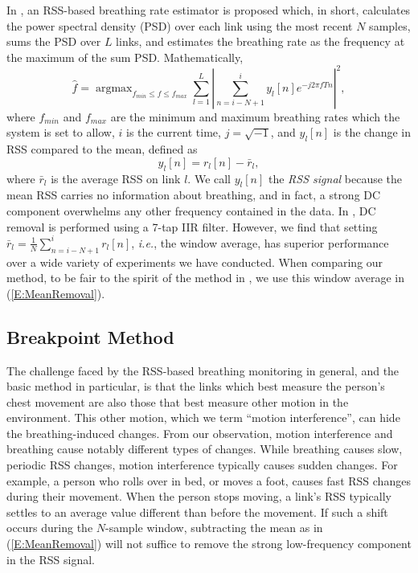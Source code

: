 \documentclass[10pt,journal,letterpaper]{IEEEtran}
\newcommand{\ie}{{\it i.e.}}
\newcommand{\argmax}[1]{\mathop{\mbox{argmax}}_{#1}}
\begin{document}
In \cite{patwari11breathing}, an RSS-based breathing rate estimator is proposed which, in short, calculates the power spectral density (PSD) over each link using the most recent $N$ samples, sums the PSD over $L$ links, and estimates the breathing rate as the frequency at the maximum of the sum PSD.  Mathematically,
\begin{equation} \label{E:PSD}
\hat{f} = \argmax{f_{min} \le f \le f_{max}} \sum_{l=1}^L \left| \sum_{n=i-N+1}^{i} y_l[n] e^{-j 2\pi f T n}\right|^2,
\end{equation}
where $f_{min}$ and $f_{max}$ are the minimum and maximum breathing rates which the system is set to allow, $i$ is the current time, $j=\sqrt{-1}$, and $y_l[n]$ is the change in RSS compared to the mean, defined as
\begin{equation}\label{E:MeanRemoval}
y_l[n] = r_l[n] - \bar{r}_l,
\end{equation}
where $\bar{r}_l$ is the average RSS on link $l$.  We call $y_l[n]$ the \emph{RSS signal} because the mean RSS carries no information about breathing, and in fact, a strong DC component overwhelms any other frequency contained in the data.  In \cite{patwari11breathing}, DC removal is performed using a 7-tap IIR filter.  However, we find that setting $\bar{r}_l = \frac{1}{N} \sum_{n=i-N+1}^{i} r_l[n]$, \ie, the window average, has superior performance over a wide variety of experiments we have conducted.  When comparing our method, to be fair to the spirit of the method in \cite{patwari11breathing}, we use this window average in (\ref{E:MeanRemoval}).

\subsection{Breakpoint Method}

The challenge faced by the RSS-based breathing monitoring in general, and the basic method in particular, is that the links which best measure the person's chest movement are also those that best measure other motion in the environment.  This other motion, which we term ``motion interference'', can hide the breathing-induced changes.  
From our observation, motion interference and breathing cause notably different types of changes.  While breathing causes slow, periodic RSS changes, motion interference typically causes sudden changes.  For example, a person who rolls over in bed, or moves a foot, causes fast RSS changes during their movement.  When the person stops moving, a link's RSS typically settles to an average value different than before the movement.  If such a shift occurs during the $N$-sample window, subtracting the mean as in (\ref{E:MeanRemoval}) will not suffice to remove the strong low-frequency component in the RSS signal.
\end{document}
